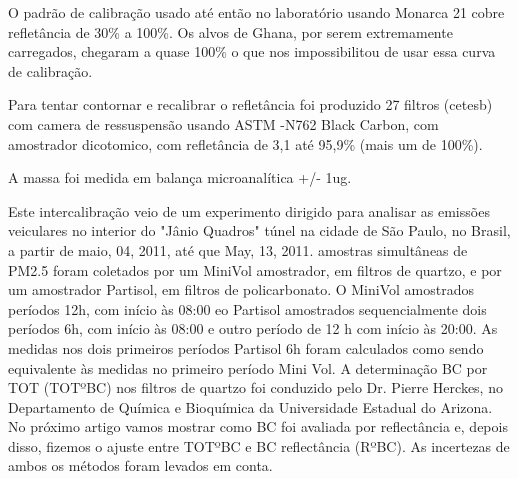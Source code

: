 O padrão de calibração usado até então no laboratório usando Monarca 21 cobre refletância de 30\% a 100\%. 
Os alvos de Ghana, por serem extremamente carregados, chegaram a quase 100\% o que nos impossibilitou de usar 
essa curva de calibração.  

Para tentar contornar e recalibrar o refletância foi produzido 27 filtros (cetesb) com camera de ressuspensão
usando ASTM -N762 Black Carbon, com amostrador dicotomico, com refletância de 3,1 até 95,9\% (mais um de 100\%).

A massa foi medida em balança microanalítica +/- 1ug.




Este intercalibração veio de um experimento dirigido para analisar as emissões veiculares no interior do "Jânio Quadros" túnel na cidade de São Paulo, no Brasil, a partir de maio, 04, 2011, até que May, 13, 2011. amostras simultâneas de PM2.5 foram coletados por um MiniVol amostrador, em filtros de quartzo, e por um amostrador Partisol, em filtros de policarbonato. O MiniVol amostrados períodos 12h, com início às 08:00 eo Partisol amostrados sequencialmente dois períodos 6h, com início às 08:00 e outro período de 12 h com início às 20:00. As medidas nos dois primeiros períodos Partisol 6h foram calculados como sendo equivalente às medidas no primeiro período Mini Vol.
A determinação BC por TOT (TOTºBC) nos filtros de quartzo foi conduzido pelo Dr. Pierre Herckes, no Departamento de Química e Bioquímica da Universidade Estadual do Arizona. No próximo artigo vamos mostrar como BC foi avaliada por reflectância e, depois disso, fizemos o ajuste entre TOTºBC e BC reflectância (RºBC). As incertezas de ambos os métodos foram levados em conta.



